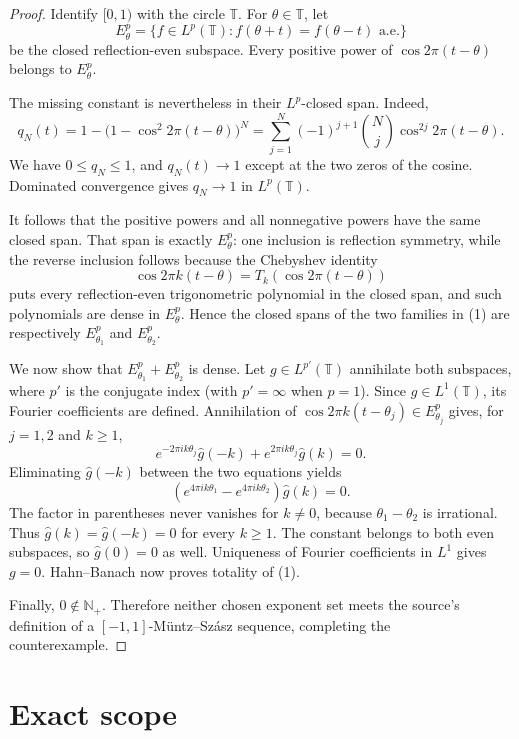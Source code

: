 \documentclass[10pt]{article}
\newcommand{\Npos}{\mathbb N_{+}}
\newcommand{\Torus}{\mathbb T}
\begin{document}
\begin{proof}
Identify $[0,1)$ with the circle $\Torus$. For $\theta\in\Torus$, let
\[
 E_\theta^p=\{f\in L^p(\Torus):f(\theta+t)=f(\theta-t)\text{ a.e.}\}
\]
be the closed reflection-even subspace. Every positive power of
$\cos 2\pi(t-\theta)$ belongs to $E_\theta^p$.

The missing constant is nevertheless in their $L^p$-closed span. Indeed,
\[
 q_N(t)=1-\bigl(1-\cos^2 2\pi(t-\theta)\bigr)^N
       =\sum_{j=1}^{N}(-1)^{j+1}\binom Nj
          \cos^{2j}2\pi(t-\theta).
 \tag{2}
\]
We have $0\le q_N\le1$, and $q_N(t)\to1$ except at the two zeros of the cosine.
Dominated convergence gives $q_N\to1$ in $L^p(\Torus)$.

It follows that the positive powers and all nonnegative powers have the same
closed span. That span is exactly $E_\theta^p$: one inclusion is reflection
symmetry, while the reverse inclusion follows because the Chebyshev identity
\[
 \cos 2\pi k(t-\theta)=T_k\!\left(\cos 2\pi(t-\theta)\right)
\]
puts every reflection-even trigonometric polynomial in the closed span, and
such polynomials are dense in $E_\theta^p$. Hence the closed spans of the two
families in (1) are respectively $E_{\theta_1}^p$ and $E_{\theta_2}^p$.

We now show that $E_{\theta_1}^p+E_{\theta_2}^p$ is dense. Let
$g\in L^{p'}(\Torus)$ annihilate both subspaces, where $p'$ is the conjugate
index (with $p'=\infty$ when $p=1$). Since $g\in L^1(\Torus)$, its Fourier
coefficients are defined. Annihilation of
$\cos 2\pi k(t-\theta_j)\in E_{\theta_j}^p$ gives, for $j=1,2$ and $k\ge1$,
\[
 e^{-2\pi i k\theta_j}\widehat g(-k)
   +e^{2\pi i k\theta_j}\widehat g(k)=0.
 \tag{3}
\]
Eliminating $\widehat g(-k)$ between the two equations yields
\[
 \left(e^{4\pi i k\theta_1}-e^{4\pi i k\theta_2}\right)\widehat g(k)=0.
\]
The factor in parentheses never vanishes for $k\ne0$, because
$\theta_1-\theta_2$ is irrational. Thus $\widehat g(k)=\widehat g(-k)=0$
for every $k\ge1$. The constant belongs to both even subspaces, so
$\widehat g(0)=0$ as well. Uniqueness of Fourier coefficients in $L^1$ gives
$g=0$. Hahn--Banach now proves totality of (1).

Finally, $0\notin\Npos$. Therefore neither chosen exponent set meets the
source's definition of a $[-1,1]$-M\"untz--Sz\'asz sequence, completing the
counterexample.
\end{proof}

\section*{Exact scope}
\end{document}
